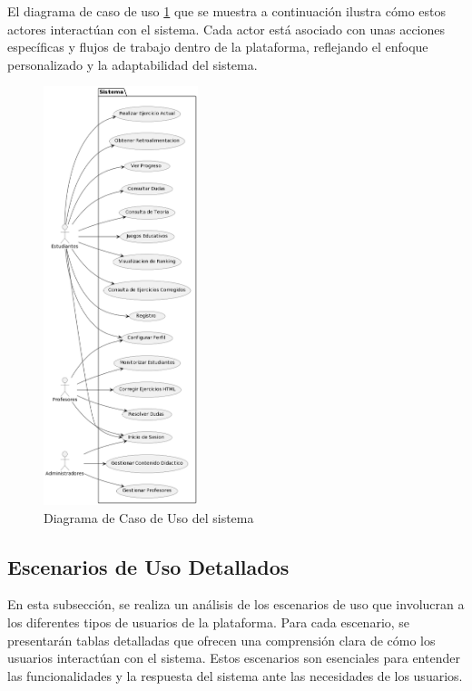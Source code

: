 El diagrama de caso de uso \ref{fig:caso_uso} que se muestra a continuación  ilustra cómo estos actores interactúan con el sistema. Cada actor está asociado con unas acciones específicas y flujos de trabajo dentro de la plataforma, reflejando el enfoque personalizado y la adaptabilidad del sistema.

\begin{figure}[H]
    \centering
    \includegraphics[width=0.4\textwidth]{imagenes/modelo.png}
    \caption{Diagrama de Caso de Uso del sistema}
    \label{fig:caso_uso}
\end{figure}

\subsection{Escenarios de Uso Detallados} \label{sec:comportamiento}

En esta subsección, se realiza un análisis de los escenarios de uso que involucran a los diferentes tipos de usuarios de la plataforma. Para cada escenario, se presentarán tablas detalladas que ofrecen una comprensión clara de cómo los usuarios interactúan con el sistema. Estos escenarios son esenciales para entender las funcionalidades y la respuesta del sistema ante las necesidades de los usuarios.

